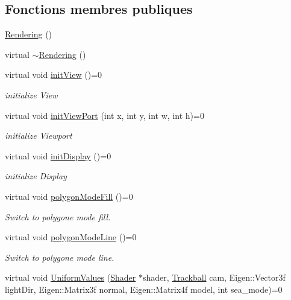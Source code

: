 \subsection*{Fonctions membres publiques}
\begin{DoxyCompactItemize}
\item 
\hyperlink{class_rendering_a2d6135f6f0563031d59f12e81c15416d}{Rendering} ()
\item 
virtual \hyperlink{class_rendering_aefe02eb379fb45f7270bd0887c6c3d5e}{$\sim$\+Rendering} ()
\item 
virtual void \hyperlink{class_rendering_abf05def5b7eb02669008cf44c3520dae}{init\+View} ()=0
\begin{DoxyCompactList}\small\item\em initialize View \end{DoxyCompactList}\item 
virtual void \hyperlink{class_rendering_a87a6dd12561315a07ec111ea2939a3c2}{init\+View\+Port} (int x, int y, int w, int h)=0
\begin{DoxyCompactList}\small\item\em initialize Viewport \end{DoxyCompactList}\item 
virtual void \hyperlink{class_rendering_ae3ad4a7f4c5559cb258d72886123c3e0}{init\+Display} ()=0
\begin{DoxyCompactList}\small\item\em initialize Display \end{DoxyCompactList}\item 
virtual void \hyperlink{class_rendering_a9ea983c02e590c78d564908d6171335e}{polygon\+Mode\+Fill} ()=0
\begin{DoxyCompactList}\small\item\em Switch to polygone mode fill. \end{DoxyCompactList}\item 
virtual void \hyperlink{class_rendering_aeb3922ecc539c6d8e9339fb3760cd560}{polygon\+Mode\+Line} ()=0
\begin{DoxyCompactList}\small\item\em Switch to polygone mode line. \end{DoxyCompactList}\item 
virtual void \hyperlink{class_rendering_a09a77bbedf75aff7535c419b6f8e4915}{Uniform\+Values} (\hyperlink{class_shader}{Shader} $\ast$shader, \hyperlink{class_trackball}{Trackball} cam, Eigen\+::\+Vector3f light\+Dir, Eigen\+::\+Matrix3f normal, Eigen\+::\+Matrix4f model, int sea\+\_\+mode)=0

\end{DoxyCompactItemize}
